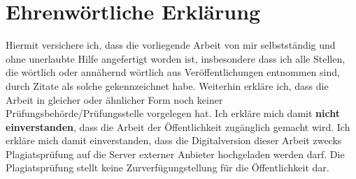 \documentclass[12pt,oneside,titlepage]{scrartcl}
\begin{document}

\printbibliography[heading=bibintoc,title=Literaturverzeichnis]

\newpage %
\section*{Ehrenwörtliche Erklärung} 
	Hiermit versichere ich, dass die vorliegende Arbeit von mir selbstständig und ohne unerlaubte Hilfe angefertigt worden ist, insbesondere dass ich alle Stellen, die wörtlich oder annähernd wörtlich aus Veröffentlichungen entnommen sind, durch Zitate als solche gekennzeichnet habe. Weiterhin erkläre ich, dass die Arbeit in gleicher oder ähnlicher Form noch keiner Prüfungsbehörde/Prüfungsstelle vorgelegen hat. Ich erkläre mich damit \textbf{nicht einverstanden}, dass die Arbeit der Öffentlichkeit zugänglich gemacht wird. Ich erkläre mich damit einverstanden, dass die Digitalversion dieser Arbeit zwecks Plagiatsprüfung auf die Server externer Anbieter hochgeladen werden darf. Die Plagiatsprüfung stellt keine Zurverfügungstellung für die Öffentlichkeit dar.

			\par\medskip
			\par\medskip

			\vspace{5cm}
\end{document}
